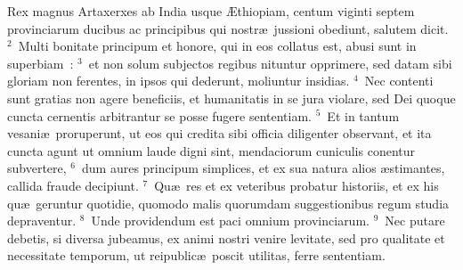 \lettrine[lines=3,image=true,loversize=0.05,lraise=-0.03]{R}{}ex magnus Artaxerxes ab India usque \AE thiopiam, centum viginti septem provinciarum ducibus ac principibus qui nostr\ae\ jussioni obediunt, salutem dicit.
${}^{2}$~Multi bonitate principum et honore, qui in eos collatus est, abusi sunt in superbiam~:
${}^{3}$~et non solum subjectos regibus nituntur opprimere, sed datam sibi gloriam non ferentes, in ipsos qui dederunt, moliuntur insidias.
${}^{4}$~Nec contenti sunt gratias non agere beneficiis, et humanitatis in se jura violare, sed Dei quoque cuncta cernentis arbitrantur se posse fugere sententiam.
${}^{5}$~Et in tantum vesani\ae\ proruperunt, ut eos qui credita sibi officia diligenter observant, et ita cuncta agunt ut omnium laude digni sint, mendaciorum cuniculis conentur subvertere,
${}^{6}$~dum aures principum simplices, et ex sua natura alios \ae stimantes, callida fraude decipiunt.
${}^{7}$~Qu\ae\ res et ex veteribus probatur historiis, et ex his qu\ae\ geruntur quotidie, quomodo malis quorumdam suggestionibus regum studia depraventur.
${}^{8}$~Unde providendum est paci omnium provinciarum.
${}^{9}$~Nec putare debetis, si diversa jubeamus, ex animi nostri venire levitate, sed pro qualitate et necessitate temporum, ut reipublic\ae\ poscit utilitas, ferre sententiam.



